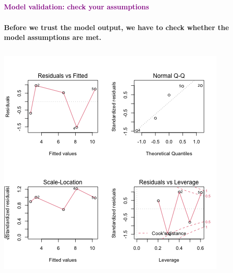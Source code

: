 \documentclass{beamer}
\newenvironment{VerbatimIN}
 {\VerbatimEnvironment
  \begin{tcolorbox}[
    breakable,
    colback=lightgray,
    spartan
  ]%
  \begin{Verbatim}}
 {\end{Verbatim}\end{tcolorbox}}
\begin{document}
\begin{frame}
    \frametitle{}
    \begin{center}
        \huge\textbf{\textcolor{purple}{Model validation: check your assumptions}}
    \end{center}
\end{frame}

\begin{frame}[fragile]
    \frametitle{}
    \textbf{Before we trust the model output, we have to check whether the model assumptions are met.}

    \begin{columns}
        \begin{column}{0.6\textwidth}
        \includegraphics[width=\textwidth]{lectures/day_2_LM_refresh_I/figures/unnamed-chunk-40-1.png}     
        \end{column}
    \end{columns}

\end{frame}
\end{document}
